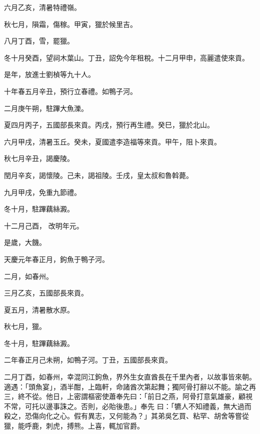 \begin{pinyinscope}
 六月乙亥，清暑特禮嶺。



 秋七月，隕霜，傷稼。甲寅，獵於候里吉。



 八月丁酉，雪，罷獵。



 冬十月癸酉，望祠木葉山。丁丑，詔免今年租稅。十二月甲申，高麗遣使來貢。



 是年，放進士劉楨等九十人。



 十年春五月辛丑，預行立春禮。如鴨子河。



 二月庚午朔，駐蹕大魚濼。



 夏四月丙子，五國部長來貢。丙戌，預行再生禮。癸巳，獵於北山。



 六月甲戌，清暑玉丘。癸未，夏國遣李造福等來貢。甲午，阻卜來貢。



 秋七月辛丑，謁慶陵。



 閏月辛亥，謁懷陵。己未，謁祖陵。壬戌，皇太叔和魯斡薨。



 九月甲戌，免重九節禮。



 冬十月，駐蹕藕絲澱。



 十二月己酉，
 改明年元。



 是歲，大饑。



 天慶元年春正月，鉤魚于鴨子河。



 二月，如春州。



 三月乙亥，五國部長來貢。



 夏五月，清暑散水原。



 秋七月，獵。



 冬十月，駐蹕藕絲澱。



 二年春正月己未朔，如鴨子河。丁丑，五國部長來貢。



 二月丁酉，如春州，幸混同江鉤魚，界外生女直酋長在千里內者，以故事皆來朝。適遇：「頭魚宴」，酒半酣，上臨軒，命諸酋次第起舞；獨阿骨打辭以不能。諭之再三，終不從。他日，上密謂樞密使蕭奉先曰：「前日之燕，阿骨打意氣雄豪，顧視不常，可托以邊事誅之。否則，必貽後患。」奉先
 曰：「犥人不知禮義，無大過而殺之，恐傷向化之心。假有異志，又何能為？」其弟吳乞買、粘罕、胡舍等嘗從獵，能呼鹿，刺虎，搏熊。上喜，輒加官爵。




\end{pinyinscope}
